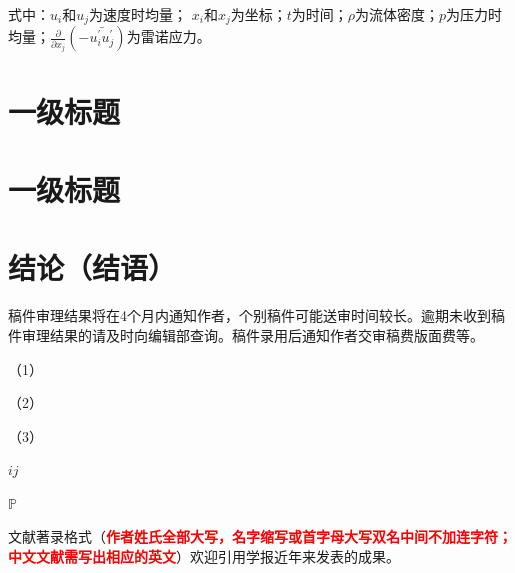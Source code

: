 \documentclass[15.5pt]{article}
\newcommand{\tr}[1]{\textcolor{red}{#1}}
\begin{document}
式中：$u_i$和$u_j$为速度时均量； $x_i$和$x_j$为坐标；$t$为时间；$\rho$为流体密度；$p$为压力时均量；$\frac{\partial}{\partial x_j} (-\bar{u_i^{'}u_j^{'}})$为雷诺应力。

\section{一级标题}

\section{一级标题}

\section{结论（结语）}
\noindent
稿件审理结果将在4个月内通知作者，个别稿件可能送审时间较长。逾期未收到稿件审理结果的请及时向编辑部查询。稿件录用后通知作者交审稿费版面费等。

（1）

（2）

（3）

$i j$

$\mathbb{P}$

文献著录格式（\textbf{\tr{作者姓氏全部大写，名字缩写或首字母大写双名中间不加连字符；中文文献需写出相应的英文}}）欢迎引用学报近年来发表的成果\cite{dAutonomousSearch2020}。


% 


\end{document}
